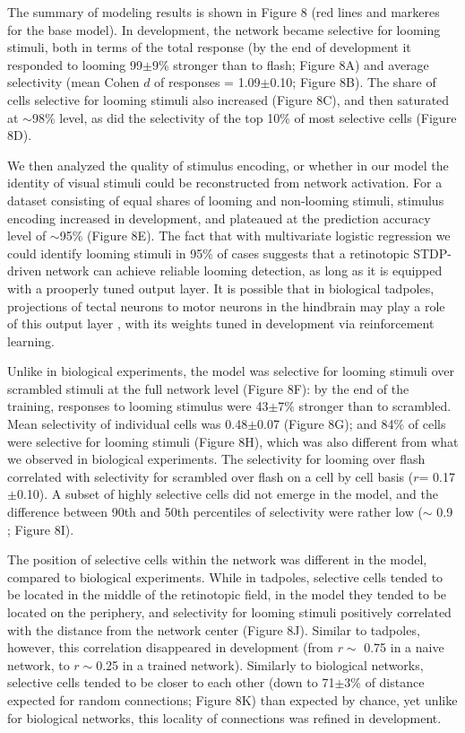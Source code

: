 \documentclass{article}
\begin{document}
The summary of modeling results is shown in Figure 8 (red lines and markeres for the base model). In development, the network became selective for looming stimuli, both in terms of the total response (by the end of development it responded to looming 99$\pm$9\% stronger than to flash; Figure 8A) and average selectivity (mean Cohen $d$ of responses = 1.09$\pm$0.10; Figure 8B). The share of cells selective for looming stimuli also increased (Figure 8C), and then saturated at $\sim$98\% level, as did the selectivity of the top 10\% of most selective cells (Figure 8D).

We then analyzed the quality of stimulus encoding, or whether in our model the identity of visual stimuli could be reconstructed from network activation. For a dataset consisting of equal shares of looming and non-looming stimuli, stimulus encoding increased in development, and plateaued at the prediction accuracy level of $\sim$95\% (Figure 8E). The fact that with multivariate logistic regression we could identify looming stimuli in 95\% of cases suggests that a retinotopic STDP-driven network can achieve reliable looming detection, as long as it is equipped with a prooperly tuned output layer. It is possible that in biological tadpoles, projections of tectal neurons to motor neurons in the hindbrain may play a role of this output layer \citep{helmbrecht2018topography}, with its weights tuned in development via reinforcement learning.

Unlike in biological experiments, the model was selective for looming stimuli over scrambled stimuli at the full network level (Figure 8F): by the end of the training, responses to looming stimulus were 43$\pm$7\% stronger than to scrambled. Mean selectivity of individual cells was 0.48$\pm$0.07 (Figure 8G); and 84\% of cells were selective for looming stimuli (Figure 8H), which was also different from what we observed in biological experiments. The selectivity for looming over flash correlated with selectivity for scrambled over flash on a cell by cell basis ($r$= 0.17$\pm$0.10). A subset of highly selective cells did not emerge in the model, and the difference between 90th and 50th percentiles of selectivity were rather low ($\sim$ 0.9 ; Figure 8I).

The position of selective cells within the network was different in the model, compared to biological experiments. While in tadpoles, selective cells tended to be located in the middle of the retinotopic field, in the model they tended to be located on the periphery, and selectivity for looming stimuli positively correlated with the distance from the network center (Figure 8J). Similar to tadpoles, however, this correlation disappeared in development (from $r\sim$ 0.75 in a naive network, to $r\sim$0.25 in a trained network). Similarly to biological networks, selective cells tended to be closer to each other (down to 71$\pm$3\% of distance expected for random connections; Figure 8K) than expected by chance, yet unlike for biological networks, this locality of connections was refined in development.
\end{document}
